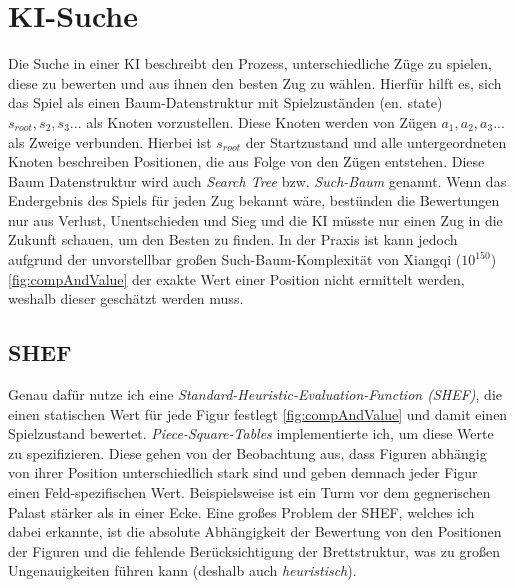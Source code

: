 \documentclass[
  manuscript=article,  %
  layout=publish,  %
  year=2023,
  volume=1,
]{extra/joas}
\begin{document}
\section{KI-Suche}
Die Suche in einer KI beschreibt den Prozess, unterschiedliche Züge zu spielen, diese zu bewerten und aus ihnen den besten Zug zu wählen. Hierfür hilft es, sich das Spiel als einen Baum-Datenstruktur mit Spielzuständen (en. state) {$s_{root}, s_2, s_3 ...$} als Knoten vorzustellen. Diese Knoten werden von Zügen {$a_1, a_2, a_3 ...$} als Zweige verbunden. Hierbei ist $s_{root}$ der Startzustand und alle untergeordneten Knoten beschreiben Positionen, die aus Folge von den Zügen entstehen. Diese Baum Datenstruktur wird auch \textit{Search Tree} bzw. \textit{Such-Baum} genannt. 
Wenn das Endergebnis des Spiels für jeden Zug bekannt wäre, bestünden die Bewertungen nur aus Verlust, Unentschieden und Sieg und die KI müsste nur einen Zug in die Zukunft schauen, um den Besten zu finden. In der Praxis ist kann jedoch aufgrund der unvorstellbar großen Such-Baum-Komplexität von Xiangqi ($10^{150}$) \ref{fig:compAndValue} der exakte Wert einer Position nicht ermittelt werden, weshalb dieser geschätzt werden muss.

\subsection{SHEF}
Genau dafür nutze ich eine \textit{Standard-Heuristic-Evaluation-Function (SHEF)}, die einen statischen Wert für jede Figur festlegt \ref{fig:compAndValue} und damit einen Spielzustand bewertet.
\textit{Piece-Square-Tables} implementierte ich, um diese Werte zu spezifizieren. Diese gehen von der Beobachtung aus, dass Figuren abhängig von ihrer Position unterschiedlich stark sind und geben demnach jeder Figur einen Feld-spezifischen Wert. Beispielsweise ist ein Turm vor dem gegnerischen Palast stärker als in einer Ecke. Eine großes Problem der SHEF, welches ich dabei erkannte, ist die absolute Abhängigkeit der Bewertung von den Positionen der Figuren und die fehlende Berücksichtigung der Brettstruktur, was zu großen Ungenauigkeiten führen kann (deshalb auch \textit{heuristisch}).
\end{document}

